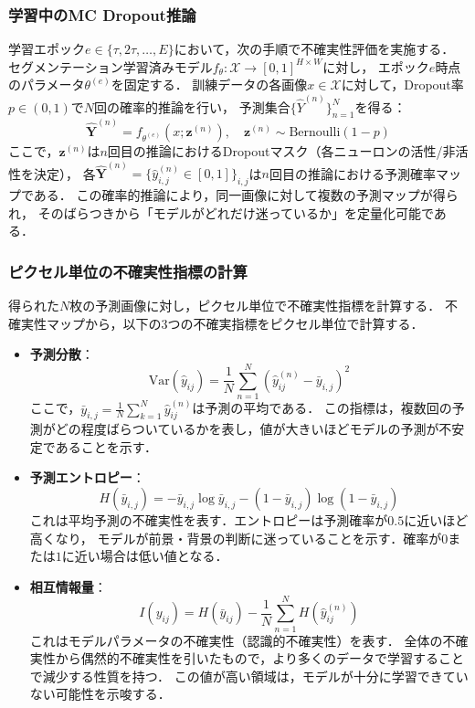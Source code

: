 \documentclass[10pt, a4paper, twocolumn]{jarticle}
\begin{document}
\subsubsection{学習中のMC Dropout推論}
学習エポック$e \in \{\tau, 2\tau, \ldots, E\}$において，次の手順で不確実性評価を実施する．
セグメンテーション学習済みモデル$f_{\theta}: \mathcal{X} \rightarrow [0,1]^{H \times W}$に対し，
エポック$e$時点のパラメータ$\theta^{(e)}$を固定する．
訓練データの各画像$x \in \mathcal{X}$に対して，Dropout率$p \in (0,1)$で$N$回の確率的推論を行い，
予測集合$\{\hat{Y}^{(n)}\}_{n=1}^{N}$を得る：
%
\begin{equation}
  \hat{\mathbf{Y}}^{(n)} = f_{\theta^{(e)}}(x; \mathbf{z}^{(n)}), \quad \mathbf{z}^{(n)} \sim \text{Bernoulli}(1-p)
\end{equation}
%
ここで，$\mathbf{z}^{(n)}$は$n$回目の推論におけるDropoutマスク（各ニューロンの活性/非活性を決定），
各$\hat{\mathbf{Y}}^{(n)} = \{\hat{y}_{i,j}^{(n)} \in [0,1]\}_{i,j}$は$n$回目の推論における予測確率マップである．
この確率的推論により，同一画像に対して複数の予測マップが得られ，
そのばらつきから「モデルがどれだけ迷っているか」を定量化可能である．

\subsubsection{ピクセル単位の不確実性指標の計算}
得られた$N$枚の予測画像に対し，ピクセル単位で不確実性指標を計算する．
不確実性マップから，以下の3つの不確実指標をピクセル単位で計算する．

\begin{itemize}
  \item \textbf{予測分散}：
  \begin{equation}
    \text{Var}(\hat{y}_{ij}) = \frac{1}{N} \sum_{n=1}^{N} (\hat{y}_{ij}^{(n)} - \bar{y}_{i,j})^2
  \end{equation}
  ここで，$\bar{y}_{i,j} = \frac{1}{N} \sum_{k = 1}^{N} \hat{y}_{ij} ^ {(n)}$は予測の平均である．
  この指標は，複数回の予測がどの程度ばらついているかを表し，値が大きいほどモデルの予測が不安定であることを示す．
  \item \textbf{予測エントロピー}：
  \begin{equation}
    H(\bar{y}_{i,j}) = - \bar{y}_{i,j} \log{\bar{y}_{i,j}} - (1 - \bar{y}_{i,j}) \log{(1 - \bar{y}_{i,j})}
  \end{equation}
  これは平均予測の不確実性を表す．エントロピーは予測確率が$0.5$に近いほど高くなり，
  モデルが前景・背景の判断に迷っていることを示す．確率が$0$または$1$に近い場合は低い値となる．
  \item \textbf{相互情報量}：
  \begin{equation}
    I(y_{ij}) = H(\bar{y}_{ij}) - \frac{1}{N}\sum_{n=1}^{N} H(\hat{y}_{ij}^{(n)})
  \end{equation}
  これはモデルパラメータの不確実性（認識的不確実性）を表す．
  全体の不確実性から偶然的不確実性を引いたもので，より多くのデータで学習することで減少する性質を持つ．
  この値が高い領域は，モデルが十分に学習できていない可能性を示唆する．
\end{itemize}
\end{document}
